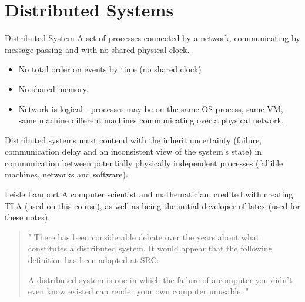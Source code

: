 \section{Distributed Systems}
\begin{definitionbox}{Distributed System}
    A set of processes connected by a network, communicating by message passing and with no shared physical clock.
    \begin{itemize}
        \item No total order on events by time (no shared clock)
        \item No shared memory.
        \item Network is logical - processes may be on the same OS process, same VM, same machine different machines communicating over a physical network. 
    \end{itemize}
\end{definitionbox}

Distributed systems must contend with the inherit uncertainty (failure, communication delay and an inconsistent view of the system's state) in communication between potentially physically independent processes (fallible machines, networks and software).

\begin{sidenotebox}{Leisle Lamport}
    A computer scientist and mathematician, credited with creating TLA (used on this course), as well as being the initial developer of latex (used for these notes).
    \begin{quote}
        "
            There has been considerable debate over the years 
            about what constitutes a distributed system. It 
            would appear that the following definition has been 
            adopted at SRC:

            A distributed system is one in which the failure of 
            a computer you didn't even know existed can render 
            your own computer unusable.
        "
    \end{quote}
\end{sidenotebox}

\unfinished